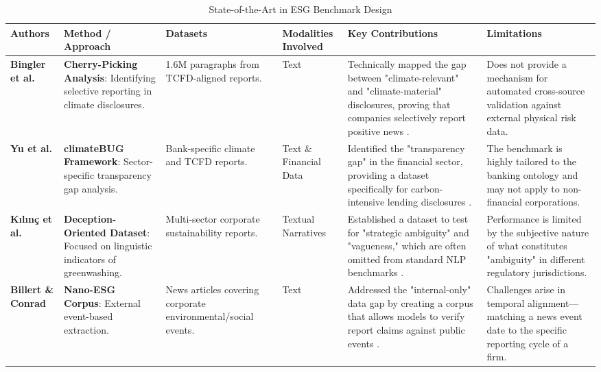 \begin{landscape}
\begin{table}[p]
\centering
\caption{State-of-the-Art in ESG Benchmark Design}
\label{tab:esg-benchmark-design}
\small
\renewcommand{\arraystretch}{1.2}
\begin{tabularx}{\linewidth}{|p{1.8cm}|p{3cm}|p{3cm}|p{1.8cm}|X|X|}
\hline
Authors & Method / Approach & Datasets & Modalities Involved & Key Contributions & Limitations \\ \hline
\textbf{Bingler et al.}  \parencite{julia_bingler_268445e3} & \textbf{Cherry-Picking Analysis}: Identifying selective reporting in climate disclosures. & 1.6M paragraphs from TCFD-aligned reports. & Text & Technically mapped the gap between "climate-relevant" and "climate-material" disclosures, proving that companies selectively report positive news  \parencite{julia_bingler_268445e3}. & Does not provide a mechanism for automated cross-source validation against external physical risk data. \\ \hline
\textbf{Yu et al.}  \parencite{yinan_yu_e282fd98} & \textbf{climateBUG Framework}: Sector-specific transparency gap analysis. & Bank-specific climate and TCFD reports. & Text \& Financial Data & Identified the "transparency gap" in the financial sector, providing a dataset specifically for carbon-intensive lending disclosures  \parencite{yinan_yu_e282fd98}. & The benchmark is highly tailored to the banking ontology and may not apply to non-financial corporations. \\ \hline
\textbf{Kılınç et al.}  \parencite{yavuz_k_l_n__64e32f80} & \textbf{Deception-Oriented Dataset}: Focused on linguistic indicators of greenwashing. & Multi-sector corporate sustainability reports. & Textual Narratives & Established a dataset to test for "strategic ambiguity" and "vagueness," which are often omitted from standard NLP benchmarks  \parencite{yavuz_k_l_n__64e32f80}. & Performance is limited by the subjective nature of what constitutes "ambiguity" in different regulatory jurisdictions. \\ \hline
\textbf{Billert \& Conrad}  \parencite{fabian_billert_a5fbb687} & \textbf{Nano-ESG Corpus}: External event-based extraction. & News articles covering corporate environmental/social events. & Text & Addressed the "internal-only" data gap by creating a corpus that allows models to verify report claims against public events  \parencite{fabian_billert_a5fbb687}. & Challenges arise in temporal alignment—matching a news event date to the specific reporting cycle of a firm. \\ \hline

\end{tabularx}
\end{table}
\end{landscape}
